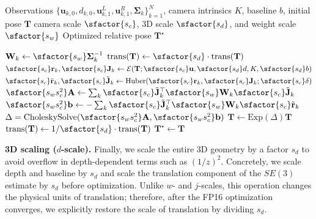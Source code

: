 \begin{algorithm}[t]
\small
\captionsetup{font=small}
\caption{FP16 Gauss-Newton optimization with scaling}
\label{alg:backend_quant}
\begin{algorithmic}[1]
\Require Observations $\{\mathbf{u}_{k,0}, d_{k,0}, \mathbf{u}_{k,1}^L, \mathbf{u}_{k,1}^R, \boldsymbol{\Sigma}_{k}\}_{k=1}^N$, 
\Statex \hspace{\algorithmicindent}\hspace{.8em} camera intrinsics $K$, baseline $b$, initial pose $\mathbf{T}$
\Statex \hspace{\algorithmicindent}\hspace{.8em} camera scale $\sfactor{s_c}$, 3D scale $\sfactor{s_d}$, and weight scale $\sfactor{s_w}$
\Ensure Optimized relative pose $\mathbf{T}^\star$

\State  $\mathbf{W}_k\gets \sfactor{s_w}\boldsymbol{\Sigma}_k^{-1}$
\State $\mathrm{trans}(\mathbf{T})\gets \sfactor{s_d} \cdot \mathrm{trans}(\mathbf{T})$
  \State $\sfactor{s_c}\mathbf{r}_k,\sfactor{s_c}\mathbf{J}_k\gets \mathcal{E}
  (\mathbf{T};\sfactor{s_c}\mathbf{u},\sfactor{s_d}d,K,\sfactor{s_d}b)$
  \State $\sfactor{s_c}\tilde{\mathbf{r}}_k,\sfactor{s_c}\tilde{\mathbf{J}}_k\gets \mathrm{Huber}(\sfactor{s_c}\mathbf{r}_k,\sfactor{s_c}\mathbf{J}_k;\sfactor{s_c}\delta)$
  \State $\sfactor{s_ws_c^2}\mathbf{A}\leftarrow \sum_k \sfactor{s_c}\tilde{\mathbf{J}}_k^\top\sfactor{s_w}\mathbf{W}_k\sfactor{s_c}\tilde{\mathbf{J}}_k$
  \State $\sfactor{s_ws_c^2}\mathbf{b}\leftarrow -\sum_k \sfactor{s_c}\tilde{\mathbf{J}}_k^\top\sfactor{s_w}\mathbf{W}_k\sfactor{s_c}\tilde{\mathbf{r}}_k$
  \State $\Delta = \mathrm{ CholeskySolve}(\sfactor{s_ws_c^2}\mathbf{A}, \sfactor{s_ws_c^2}\mathbf{b})$ 
  \scriptsize
  \State $\mathbf{T}\leftarrow \mathrm{Exp}(\Delta)\mathbf{T}$
\scriptsize
\EndFor
\scriptsize
\State $\mathrm{trans}(\mathbf{T})\gets 1/\sfactor{s_d} \cdot \mathrm{trans}(\mathbf{T})$
\State \Return $\mathbf{T}^\star\leftarrow \mathbf{T}$
\end{algorithmic}
\end{algorithm}

\textbf{3D scaling ($d$-scale).}
Finally, we scale the entire 3D geometry by a factor $s_d$ to avoid overflow in depth-dependent terms such as $(1/z)^2$. Concretely, we scale depth and baseline by $s_d$ and scale the translation component of the $SE(3)$ estimate by $s_d$ before optimization. Unlike $w$- and $j$-scales, this operation changes the physical units of translation; therefore, after the FP16 optimization converges, we explicitly restore the scale of translation by dividing $s_d$.

